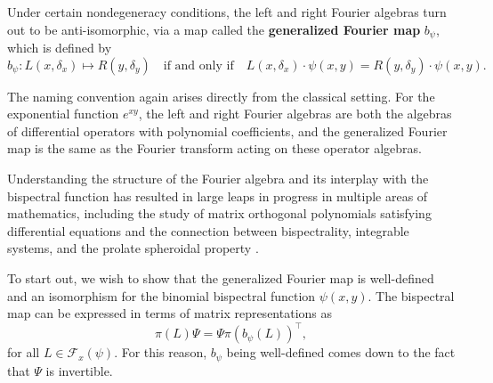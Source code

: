 \documentclass[11pt]{amsart}
\theoremstyle{plain}
\theoremstyle{named}
\newcommand{\vocab}[1]{\textbf{#1}}
\begin{document}
Under certain nondegeneracy conditions, the left and right Fourier algebras turn out to be anti-isomorphic, via a map called the \vocab{generalized Fourier map} $b_\psi$, which is defined by
\begin{equation}\label{eqn:fourier map}
b_\psi: L(x,\delta_x)\mapsto R(y,\delta_y)\quad\text{if and only if}\quad L(x,\delta_x)\cdot \psi(x,y) =R(y,\delta_y)\cdot \psi(x,y).
\end{equation}

The naming convention again arises directly from the classical setting.
For the exponential function $e^{xy}$, the left and right Fourier algebras are both the algebras of differential operators with polynomial coefficients, and the generalized Fourier map is the same as the Fourier transform acting on these operator algebras.

Understanding the structure of the Fourier algebra and its interplay with the bispectral function has resulted in large leaps in progress in multiple areas of mathematics, including the study of matrix orthogonal polynomials satisfying differential equations \cite{CY2} and the connection between bispectrality, integrable systems, and the prolate spheroidal property \cite{CY1,CGYZ1,CGYZ2}.

To start out, we wish to show that the generalized Fourier map is well-defined and an isomorphism for the binomial bispectral function $\psi(x,y)$.
The bispectral map can be expressed in terms of matrix representations as
$$\pi(L)\Psi = \Psi \pi(b_\psi(L))^\intercal,$$
for all $L\in \mathcal F_x(\psi)$.
For this reason, $b_\psi$ being well-defined comes down to the fact that $\Psi$ is invertible.
\end{document}
